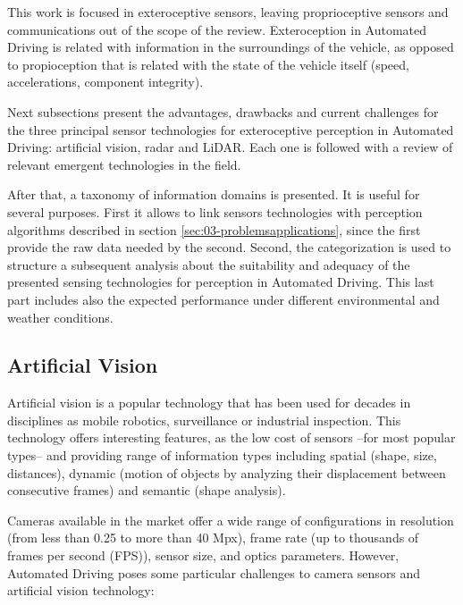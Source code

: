 
This work is focused in exteroceptive sensors, leaving proprioceptive sensors
and communications out of the scope of the review.
Exteroception in Automated Driving is related with information in the
surroundings of the vehicle, as opposed to propioception that is related with 
the state of the vehicle itself (speed, accelerations, component integrity). 

Next subsections present the advantages, drawbacks and current challenges for 
the three principal sensor technologies for exteroceptive perception in
Automated Driving: artificial vision, radar and LiDAR. 
Each one is followed with a review of relevant emergent technologies in the
field.

After that, a taxonomy of information domains is presented. It is useful for
several purposes. First it allows to link sensors technologies with perception 
algorithms described in section \ref{sec:03-problemsapplications}, 
since the first provide the raw data needed by the second. 
Second, the categorization is used to structure a subsequent
analysis about the suitability and adequacy of the presented sensing 
technologies for perception in Automated Driving. 
This last part includes also the expected performance under different
environmental and weather conditions.

\subsection{Artificial Vision}
Artificial vision is a popular technology that has been used for decades in 
disciplines as mobile robotics, surveillance or industrial inspection. 
This technology offers interesting features, as the low cost of sensors 
--for most popular types-- and providing range of information types including
spatial (shape, size, distances), dynamic (motion of objects by analyzing their 
displacement between consecutive frames) and semantic (shape analysis).

Cameras available in the market offer a wide range of configurations in
resolution (from less than 0.25 to more than 40 Mpx), frame rate (up to
thousands of frames per second (FPS)), sensor size, and optics parameters.
However, Automated Driving poses some particular challenges to camera sensors
and artificial vision technology:


